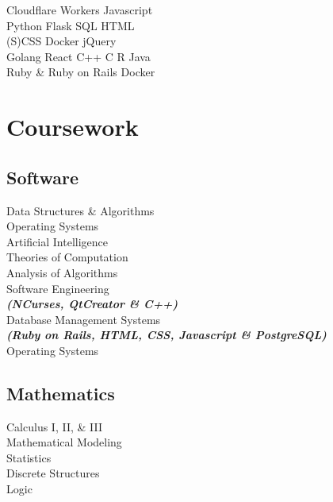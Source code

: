\documentclass[letterpaper]{deedy-resume} %
\begin{document}
\begin{minipage}[t]{0.35\textwidth}
Cloudflare Workers \textbullet{} Javascript \\ Python \textbullet{} Flask \textbullet{} SQL \textbullet{} HTML \\ (S)CSS \textbullet{} Docker \textbullet{} jQuery \\
\sectionspace
{}
Golang \textbullet{} React \textbullet{} C++ \textbullet{} C \textbullet{} R \textbullet{} Java \\ Ruby \& Ruby on Rails \textbullet{} Docker \\

\sectionspace %


\section*{Coursework}



\subsection{Software}

Data Structures \& Algorithms \\
Operating Systems \\
Artificial Intelligence \\
Theories of Computation \\
Analysis of Algorithms \\
Software Engineering \\
{\footnotesize \textit{\textbf{(NCurses, QtCreator \& C++) }}} \\
Database Management Systems \\
{\footnotesize \textit{\textbf{(Ruby on Rails, HTML, CSS, Javascript \& PostgreSQL) }}} \\
Operating Systems \\
 
\sectionspace

\subsection{Mathematics}
Calculus I, II, \& III \\
Mathematical Modeling \\
Statistics \\
Discrete Structures \\
Logic \\


\end{minipage}
\end{document}
